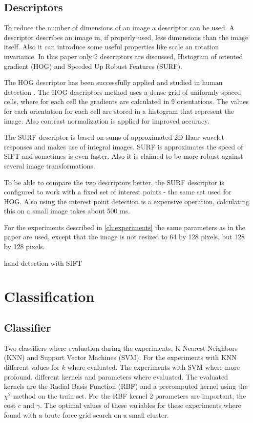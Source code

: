 \subsection*{Descriptors}
To reduce the number of dimensions of an image a descriptor can be used. A descriptor describes an image in, if properly used, less dimensions than the image itself. Also it can introduce some useful properties like scale an rotation invariance. In this paper only 2 descriptors are discussed, Histogram of oriented gradient\cite{NavneetDalal2006} (HOG) and Speeded Up Robust Features\cite{Bay2006} (SURF).

The HOG descriptor has been successfully applied and studied in human detection \cite{NavneetDalal2006, watanabe2009}. The HOG descriptors method uses a dense grid of uniformly spaced cells, where for each cell the gradients are calculated in 9 orientations. The values for each orientation for each cell are stored in a histogram that represent the image. Also contrast normalization is applied for improved accuracy.

The SURF descriptor is based on sums of approximated 2D Haar wavelet responses and makes use of integral images. SURF is approximates the speed of SIFT and sometimes is even faster\cite{Murillo2007, Valgren2010}. Also it is claimed to be more robust against several image transformations.

To be able to compare the two descriptors better, the SURF descriptor is configured to work with a fixed set of interest points - the same set used for HOG. Also using the interest point detection is a expensive operation, calculating this on a small image takes about 500 ms.

For the experiments described in \autoref{ch:experiments} the same parameters as in the \cite{watanabe2009} paper are used, except that the image is not resized to 64 by 128 pixels, but 128 by 128 pixels.

hand detection with SIFT\cite{Wang2007}

\section{Classification}

\subsection*{Classifier}
Two classifiers where evaluation during the experiments, K-Nearest Neighbors (KNN) and Support Vector Machines (SVM). For the experiments with KNN different values for $k$ where evaluated. The experiments with SVM where more profound, different kernels and parameters where evaluated. The evaluated kernels are the Radial Basis Function (RBF) and a precomputed kernel using the $\chi^2$ method on the train set. For the RBF kernel 2 parameters are important, the cost $c$ and $\gamma$. The optimal values of these variables for these experiments where found with a brute force grid search on a small cluster.

